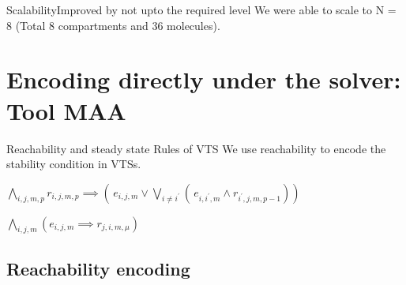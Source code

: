 \documentclass{beamer}
\begin{document}



\begin{frame}{Scalability}{Improved by not upto the required level}
We were able to scale to N = 8 (Total 8 compartments and 36 molecules). 
\end{frame} 

\section{Encoding directly under the solver: Tool MAA}

  \begin{frame}[label=proof]{Reachability and steady state Rules of VTS}
    We use reachability to encode the stability condition in VTSs.
      \begin{definition}
        $\bigwedge\limits_{i,j,m,p} r_{i,j,m,p} \implies (\, e_{i,j,m} \lor \bigvee_{i\neq i^{\prime}} ( \, e_{i,i^{\prime},m} \land r_{i^{\prime},j,m,p-1} ) )$
      \end{definition}
      \begin{theorem}
        $\bigwedge\limits_{i,j,m} ( e_{i,j,m} \implies r_{j,i,m,\mu})$
      \end{theorem}
    \end{frame}
    
    \subsection{Reachability encoding}
\end{document}
